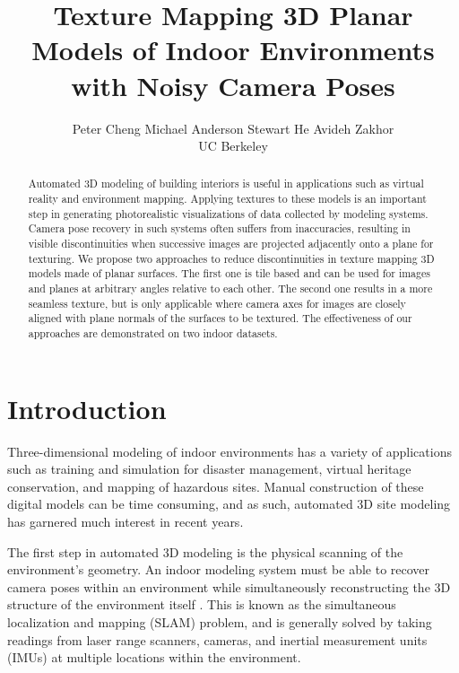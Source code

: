 \documentclass[10pt,twocolumn,letterpaper]{article}
\begin{document}
\title{Texture Mapping 3D Planar Models of Indoor Environments with Noisy
  Camera Poses}

\author{Peter Cheng \hspace*{2em} Michael Anderson \hspace*{2em} Stewart He \hspace*{2em} Avideh Zakhor\\
  UC Berkeley\\
}
\maketitle

\begin{abstract}
  Automated 3D modeling of building interiors is useful in
  applications such as virtual reality and environment
  mapping. Applying textures to these models is an important step in
  generating photorealistic visualizations of data collected by
  modeling systems. Camera pose recovery in such systems often suffers
  from inaccuracies, resulting in visible discontinuities when
  successive images are projected adjacently onto a plane for
  texturing. We propose two approaches to reduce discontinuities in
  texture mapping 3D models made of planar surfaces. The first one is
  tile based and can be used for images and planes at arbitrary angles
  relative to each other. The second one results in a more seamless
  texture, but is only applicable where camera axes for images are
  closely aligned with plane normals of the surfaces to be
  textured. The effectiveness of our approaches are demonstrated on
  two indoor datasets.
\end{abstract}

\section{Introduction}
\label{sec:introduction}
Three-dimensional modeling of indoor environments has a variety of
applications such as training and simulation for disaster management,
virtual heritage conservation, and mapping of hazardous sites. Manual
construction of these digital models can be time consuming, and as
such, automated 3D site modeling has garnered much interest in recent
years.

The first step in automated 3D modeling is the physical scanning of
the environment's geometry. An indoor modeling system must be able to
recover camera poses within an environment while simultaneously
reconstructing the 3D structure of the environment itself
\cite{chen2010indoor, hz, kua2012loopclosure, liu2010indoor}. This is
known as the simultaneous localization and mapping (SLAM) problem, and
is generally solved by taking readings from laser range scanners,
cameras, and inertial measurement units (IMUs) at multiple locations
within the environment.
\end{document}
